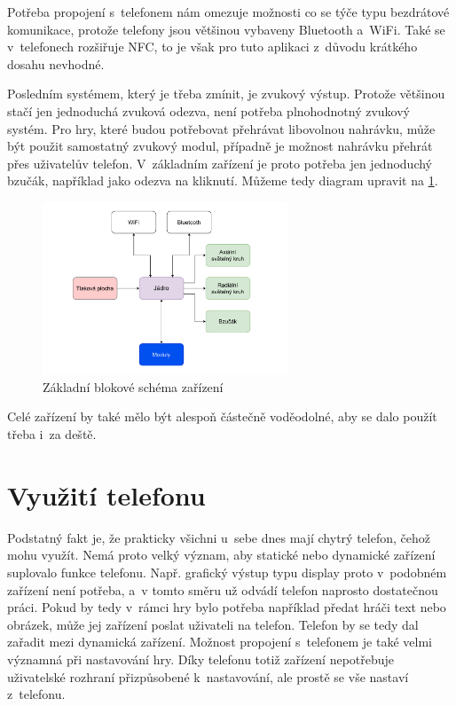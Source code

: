 Potřeba propojení s~telefonem nám omezuje možnosti co se týče typu bezdrátové komunikace, protože telefony jsou většinou vybaveny Bluetooth a~WiFi.
Také se v~telefonech rozšiřuje NFC, to je však pro tuto aplikaci z~důvodu krátkého dosahu nevhodné.

Posledním systémem, který je třeba zmínit, je zvukový výstup.
Protože většinou stačí jen jednoduchá zvuková odezva, není potřeba plnohodnotný zvukový systém.
Pro hry, které budou potřebovat přehrávat libovolnou nahrávku, může být použit samostatný zvukový modul, případně je možnost nahrávku přehrát přes uživatelův telefon.
V~základním zařízení je proto potřeba jen jednoduchý bzučák, například jako odezva na kliknutí.
Můžeme tedy diagram upravit na \ref{fig:diagram_zanoreni_1}.
\begin{figure}[h]
    \centering
    \includegraphics[width=0.65\textwidth]{text/TeoretickyUvod/AplikaceHernichZarizeni/diagram/zanoreni_1.pdf}
    \caption{Základní blokové schéma zařízení}
    \label{fig:diagram_zanoreni_1}
\end{figure}

Celé zařízení by také mělo být alespoň částečně voděodolné, aby se dalo použít třeba i~za deště.

\section{Využití telefonu \label{VyuzitiTelefonu}}
Podstatný fakt je, že prakticky všichni u~sebe dnes mají chytrý telefon, čehož mohu využít.
Nemá proto velký význam, aby statické nebo dynamické zařízení suplovalo funkce telefonu.
Např. grafický výstup typu display proto v~podobném zařízení není potřeba, a~v tomto směru už odvádí telefon naprosto dostatečnou práci.
Pokud by tedy v~rámci hry bylo potřeba například předat hráči text nebo obrázek, může jej zařízení poslat uživateli na telefon.
Telefon by se tedy dal zařadit mezi dynamická zařízení.
Možnost propojení s~telefonem je také velmi významná při nastavování hry.
Díky telefonu totiž zařízení nepotřebuje uživatelské rozhraní přizpůsobené k~nastavování, ale prostě se vše nastaví z~telefonu.

